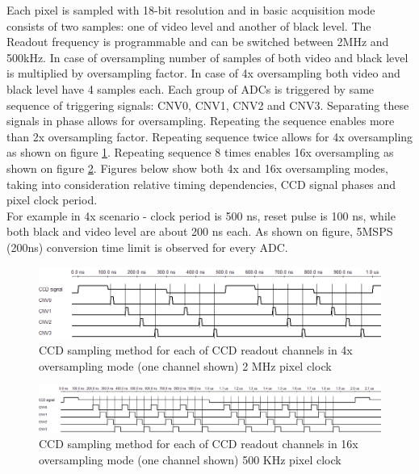 Each pixel is sampled with 18-bit resolution and in basic acquisition mode consists of two samples: one of video level and another of black level. The Readout frequency is programmable and can be switched between 2MHz and 500kHz. In case of oversampling number of samples of both video and black level is multiplied by oversampling factor. In case of 4x oversampling both video and black level have 4 samples each.  Each group of ADCs is triggered by same sequence of triggering signals: CNV0, CNV1, CNV2 and CNV3. Separating these signals in phase allows for oversampling. Repeating the sequence enables more than 2x oversampling factor. Repeating sequence twice allows for 4x oversampling as shown on figure \ref{fig:sampling_4x}. Repeating sequence 8 times enables 16x oversampling as shown on figure \ref{fig:sampling_16x}. Figures below show both 4x and 16x oversampling modes, taking into consideration relative timing dependencies, CCD signal phases and pixel clock period. \\ 
For example in 4x scenario - clock period is 500 ns, reset pulse is 100 ns, while both black and video level are about 200 ns each. As shown on figure, 5MSPS (200ns) conversion time limit is observed for every ADC.

\begin{figure}[H]
\centering
\includegraphics[width=\textwidth]{pict/CCD_sampling_4x.png}
\caption{CCD sampling method for each of CCD readout channels in 4x oversampling mode (one channel shown) 2 MHz pixel clock}
\label{fig:sampling_4x}
\end{figure}

\begin{figure}[H]
\centering
\includegraphics[width=\textwidth]{pict/CCD_sampling_16x.png}
\caption{CCD sampling method for each of CCD readout channels in 16x oversampling mode (one channel shown) 500 KHz pixel clock}
\label{fig:sampling_16x}
\end{figure}

